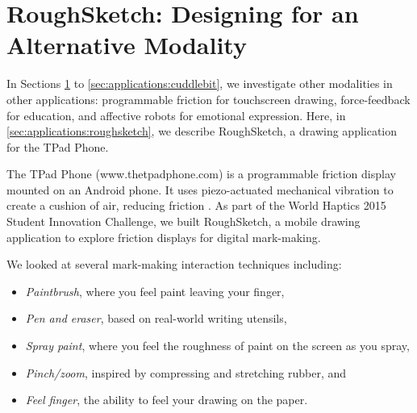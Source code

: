 \section{RoughSketch: Designing for an Alternative Modality}
\label{sec:applications:roughsketch}

In Sections \ref{sec:applications:roughsketch} to \ref{sec:applications:cuddlebit}, we investigate other modalities in other applications: programmable friction for touchscreen drawing, force-feedback for education, and affective robots for emotional expression.
Here, in \autoref{sec:applications:roughsketch}, we describe RoughSketch, a drawing application for the TPad Phone.

The TPad Phone (www.thetpadphone.com) is a programmable friction display mounted on an Android phone.
It uses piezo-actuated mechanical vibration to create a cushion of air, reducing friction \cite{Winfield2007}.
As part of the World Haptics 2015 Student Innovation Challenge, we built RoughSketch, a mobile drawing application to explore friction displays for digital mark-making.


We looked at several mark-making interaction techniques including:
\begin{itemize}
    \item \textit{Paintbrush}, where you feel paint leaving your finger,
    \item \textit{Pen and eraser}, based on real-world writing utensils,
    \item \textit{Spray paint}, where you feel the roughness of paint on the screen as you spray,
    \item \textit{Pinch/zoom}, inspired by compressing and stretching rubber, and
    \item \textit{Feel finger}, the ability to feel your drawing on the paper.
\end{itemize}

